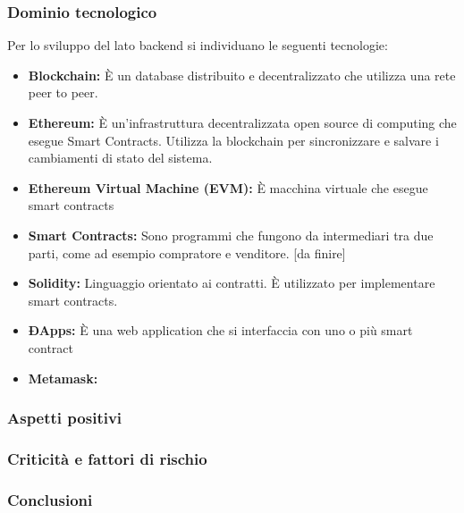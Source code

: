 \subsubsection{Dominio tecnologico}
Per lo sviluppo del lato backend si individuano le seguenti tecnologie:
\begin{itemize}
    \item \textbf{Blockchain: }\`E un database distribuito e 
    decentralizzato che utilizza una rete peer to peer.
	\item \textbf{Ethereum: }\`E un'infrastruttura decentralizzata open source di computing che
	esegue Smart Contracts. Utilizza la blockchain per sincronizzare e salvare i cambiamenti di stato
	del sistema.
	\item \textbf{Ethereum Virtual Machine (EVM): }\`E macchina virtuale che esegue smart contracts
	\item \textbf{Smart Contracts: } Sono programmi che fungono da intermediari tra due parti, come ad esempio
	compratore e venditore. [da finire]
	\item \textbf{Solidity: }Linguaggio orientato ai contratti. \`E utilizzato per implementare smart contracts.
	\item \textbf{ÐApps: } \`E una web application che si interfaccia con uno o più smart contract
	\item \textbf{Metamask: }
\end{itemize}

\subsubsection{Aspetti positivi}

\subsubsection{Criticità e fattori di rischio}

\subsubsection{Conclusioni}
